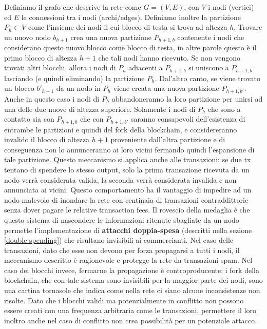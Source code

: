 Definiamo il grafo che descrive la rete come $G = (V,E)$, con $V$ i nodi (vertici) ed $E$ le connessioni tra i nodi (archi/edges). Definiamo inoltre la partizione $P_h \subset V$ come l'insieme dei nodi il cui blocco di testa si trova ad altezza $h$. Trovare un nuovo nodo $b_{h+1}$ crea una nuova partizione $P_{h+1,b}$ contenente i nodi che considerano questo nuovo blocco come blocco di testa, in altre parole questo è il primo blocco di altezza $h+1$ che tali nodi hanno ricevuto. Se non vengono trovati altri blocchi, allora i nodi di $P_h$ adiacenti a $P_{h+1,b}$ si uniscono a $P_{h+1,b}$ lasciando (e quindi eliminando) la partizione $P_h$. Dal'altro canto, se viene trovato un blocco $b'_{h+1}$ da un nodo in $P_h$ viene creata una nuova partizione $P_{h+1,b'}$. Anche in questo caso i nodi di $P_h$ abbandoneranno la loro partizione per unirsi ad una delle due nuove di altezza superiore. Solamente i nodi di $P_h$ che sono a contatto sia con $P_{h+1,b}$ che con $P_{h+1,b'}$ saranno consapevoli dell'esistenza di entrambe le partizioni e quindi del fork della blockchain, e considereranno invalido il blocco di altezza $h+1$ proveniente dall'altra partizione e di conseguenza non lo annunceranno ai loro vicini fermando quindi l'espansione di tale partizione. Questo meccanismo si applica anche alle transazioni: se due tx tentano di spendere lo stesso output, solo la prima transazione ricevuta da un nodo verrà considerata valida, la seconda verrà considerata invalida e non annunciata ai vicini. Questo comportamento ha il vantaggio di impedire ad un nodo malevolo di inondare la rete con centinaia di transazioni contraddittorie senza dover pagare le relative transaction fees. Il rovescio della medaglia è che questo sistema di nascondere le informazioni ritenute sbagliate da un nodo permette l'implementazione di \textbf{attacchi doppia-spesa} (descritti nella sezione \ref{double-spending}) che risultano invisibili ai commercianti. Nel caso delle transazioni, dato che esse non devono per forza propagarsi a tutti i nodi, il meccanismo descritto è ragionevole e protegge la rete da transazioni spam. Nel caso dei blocchi invece, fermarne la propagazione è controproducente: i fork della blockchain, che con tale sistema sono invisibili per la maggior parte dei nodi, sono una cartina tornasole che indica come nella rete ci siano alcune inconsistenze non risolte. Dato che i blocchi validi ma potenzialmente in conflitto non possono essere creati con una frequenza arbitraria come le transazioni, permettere il loro inoltro anche nel caso di conflitto non crea possibilità per un potenziale attacco.

